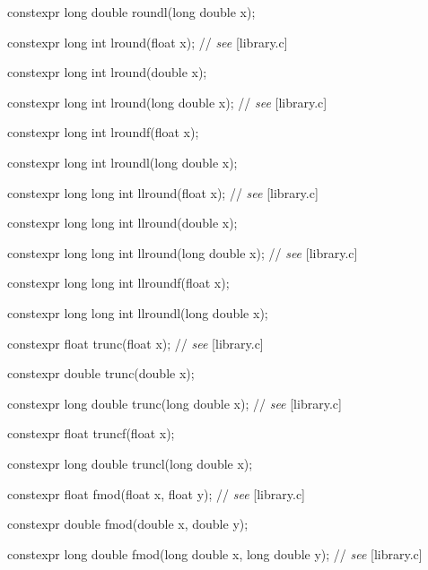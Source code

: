 \documentclass[prd,twocolumn,amsmath,amssymb,nofootinbib,eqsecnum]{revtex4-1}
\newcommand{\oldhighlight}[1]{{\color{green} #1}}
\newcommand{\stdcomment}[1]{{// {\em see} [#1]}}
\begin{document}
{\oldhighlight{constexpr} long double roundl(long double x);

\vspace{2ex}


\oldhighlight{constexpr} long int lround(float x); \stdcomment{library.c}

\oldhighlight{constexpr} long int lround(double x);

\oldhighlight{constexpr} long int lround(long double x); \stdcomment{library.c}

\oldhighlight{constexpr} long int lroundf(float x);

\oldhighlight{constexpr} long int lroundl(long double x);

\vspace{2ex}


\oldhighlight{constexpr} long long int llround(float x); \stdcomment{library.c}

\oldhighlight{constexpr} long long int llround(double x);

\oldhighlight{constexpr} long long int llround(long double x); \stdcomment{library.c}

\oldhighlight{constexpr} long long int llroundf(float x);

\oldhighlight{constexpr} long long int llroundl(long double x);

\vspace{2ex}


\oldhighlight{constexpr} float trunc(float x); \stdcomment{library.c}

\oldhighlight{constexpr} double trunc(double x);

\oldhighlight{constexpr} long double trunc(long double x); \stdcomment{library.c}

\oldhighlight{constexpr} float truncf(float x);

\oldhighlight{constexpr} long double truncl(long double x);

\vspace{2ex}


\oldhighlight{constexpr} float fmod(float x, float y); \stdcomment{library.c}

\oldhighlight{constexpr} double fmod(double x, double y);

\oldhighlight{constexpr} long double fmod(long double x, long double y); \stdcomment{library.c}

}
\end{document}
